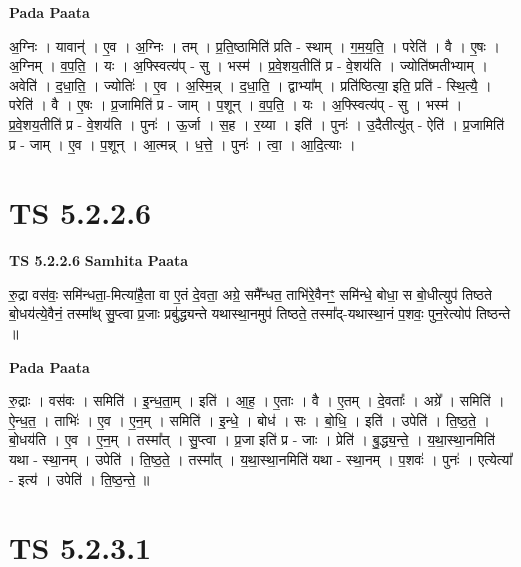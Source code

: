 \documentclass[17pt]{extarticle}
\begin{document}
\textbf{Pada Paata} \newline

अ॒ग्निः । यावान्॑ । ए॒व । अ॒ग्निः । तम् । प्र॒ति॒ष्ठामिति॑ प्रति - स्थाम् । ग॒म॒य॒ति॒ । परेति॑ । वै । ए॒षः । अ॒ग्निम् । व॒प॒ति॒ । यः । अ॒फ्स्वित्य॑प् - सु । भस्म॑ । प्र॒वे॒शय॒तीति॑ प्र - वे॒शय॑ति । ज्योति॑ष्मतीभ्याम् । अवेति॑ । द॒धा॒ति॒ । ज्योतिः॑ । ए॒व । अ॒स्मि॒न्न् । द॒धा॒ति॒ । द्वाभ्या᳚म् । प्रति॑ष्ठित्या॒ इति॒ प्रति॑ - स्थि॒त्यै॒ । परेति॑ । वै । ए॒षः । प्र॒जामिति॑ प्र - जाम् । प॒शून् । व॒प॒ति॒ । यः । अ॒फ्स्वित्य॑प् - सु । भस्म॑ । प्र॒वे॒शय॒तीति॑ प्र - वे॒शय॑ति । पुनः॑ । ऊ॒र्जा । स॒ह । र॒य्या । इति॑ । पुनः॑ । उ॒दैतीत्यु॑त् - ऐति॑ । प्र॒जामिति॑ प्र - जाम् । ए॒व । प॒शून् । आ॒त्मन्न् । ध॒त्ते॒ । पुनः॑ । त्वा॒ । आ॒दि॒त्याः ।  \newline





\section{ TS 5.2.2.6 }

\textbf{TS 5.2.2.6 } \newline
\textbf{Samhita Paata} \newline

रु॒द्रा वस॑वः॒ समि॑न्धता॒-मित्या॑है॒ता वा ए॒तं दे॒वता॒ अग्रे॒ समै᳚न्धत॒ ताभि॑रे॒वैनꣳ॒॒ समि॑न्धे॒ बोधा॒ स बो॒धीत्युप॑ तिष्ठते बो॒धय॑त्ये॒वैनं॒ तस्मा᳚थ् सु॒प्त्वा प्र॒जाः प्रबु॑द्ध्यन्ते यथास्था॒नमुप॑ तिष्ठते॒ तस्मा᳚द्-यथास्था॒नं प॒शवः॒ पुन॒रेत्योप॑ तिष्ठन्ते ॥ \newline

\textbf{Pada Paata} \newline

रु॒द्राः । वस॑वः । समिति॑ । इ॒न्ध॒ता॒म् । इति॑ । आ॒ह॒ । ए॒ताः । वै । ए॒तम् । दे॒वताः᳚ । अग्रे᳚ । समिति॑ । ऐ॒न्ध॒त॒ । ताभिः॑ । ए॒व । ए॒न॒म् । समिति॑ । इ॒न्धे॒ । बोध॑ । सः । बो॒धि॒ । इति॑ । उपेति॑ । ति॒ष्ठ॒ते॒ । बो॒धय॑ति । ए॒व । ए॒न॒म् । तस्मा᳚त् । सु॒प्त्वा । प्र॒जा इति॑ प्र - जाः । प्रेति॑ । बु॒द्ध्य॒न्ते॒ । य॒था॒स्था॒नमिति॑ यथा - स्था॒नम् । उपेति॑ । ति॒ष्ठ॒ते॒ । तस्मा᳚त् । य॒था॒स्था॒नमिति॑ यथा - स्था॒नम् । प॒शवः॑ । पुनः॑ । एत्येत्या᳚ - इत्य॑ । उपेति॑ । ति॒ष्ठ॒न्ते॒ ॥  \newline





\section{ TS 5.2.3.1 }
\end{document}
